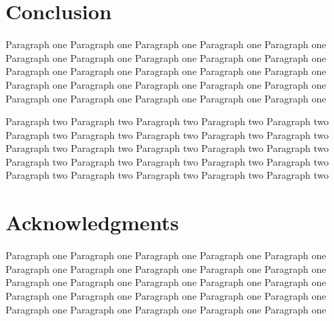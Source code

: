 \documentclass[10pt,journal,final,a4paper,nofonttune]{IEEEtran}
\begin{document}
\section{Conclusion}

Paragraph one Paragraph one Paragraph one Paragraph one Paragraph one 
Paragraph one Paragraph one Paragraph one Paragraph one Paragraph one 
Paragraph one Paragraph one Paragraph one Paragraph one Paragraph one 
Paragraph one Paragraph one Paragraph one Paragraph one Paragraph one 
Paragraph one Paragraph one Paragraph one Paragraph one Paragraph one 

Paragraph two Paragraph two Paragraph two Paragraph two Paragraph two 
Paragraph two Paragraph two Paragraph two Paragraph two Paragraph two 
Paragraph two Paragraph two Paragraph two Paragraph two Paragraph two 
Paragraph two Paragraph two Paragraph two Paragraph two Paragraph two 
Paragraph two Paragraph two Paragraph two Paragraph two Paragraph two 

\section*{Acknowledgments}

Paragraph one Paragraph one Paragraph one Paragraph one Paragraph one 
Paragraph one Paragraph one Paragraph one Paragraph one Paragraph one 
Paragraph one Paragraph one Paragraph one Paragraph one Paragraph one 
Paragraph one Paragraph one Paragraph one Paragraph one Paragraph one 
Paragraph one Paragraph one Paragraph one Paragraph one Paragraph one 



\end{document}
